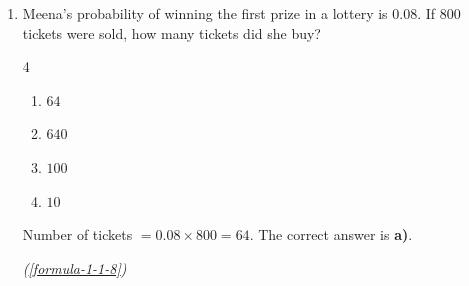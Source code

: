 \begin{enumerate}[label={},leftmargin=1.15cm,labelwidth=1.0cm,labelsep=0.15cm,itemindent=0pt,listparindent=0pt,parsep=0pt,topsep=0pt]
\item[5.1.16] Meena's probability of winning the first prize in a lottery is $0.08$. If 800 tickets were sold, how many tickets did she buy?

\begin{multicols}{4}
\begin{enumerate}
\setlength{\itemsep}{0pt}
    \item $64$
    \item $640$
    \item $100$
    \item $10$
\end{enumerate}
\end{multicols}

\vspace{0.7em}\par\solution
 Number of tickets $=0.08\times800=64$. The correct answer is \textbf{a)}.
\par\noindent\hfill\mbox{\textit{(\ref{formula-1-1-8})}}\par\end{enumerate}
\vspace{1.2em}

